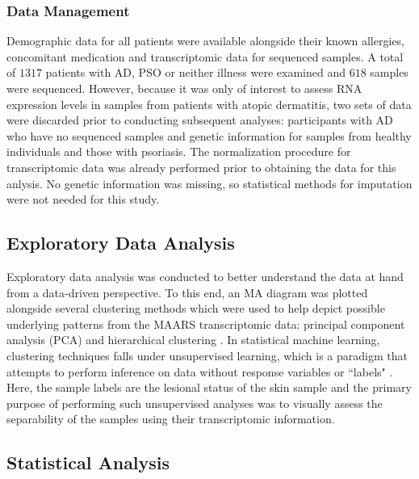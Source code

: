 \documentclass[journal, a4paper]{IEEEtran}
\begin{document}

\subsubsection*{Data Management}

Demographic data for all patients were available alongside their known allergies, concomitant medication and transcriptomic data for sequenced samples. A total of $1317$ patients with AD, PSO or neither illness were examined and $618$ samples were sequenced. However, because it was only of interest to assess RNA expression levels in samples from patients with atopic dermatitis, two sets of data were discarded prior to conducting subsequent analyses: participants with AD who have no sequenced samples and genetic information for samples from healthy individuals and those with psoriasis. The normalization procedure for transcriptomic data was already performed prior to obtaining the data for this anlysis. No genetic information was missing, so statistical methods for imputation were not needed for this study.


\subsection{Exploratory Data Analysis}

Exploratory data analysis was conducted to better understand the data at hand from a data-driven perspective. To this end, an MA diagram was plotted alongside several clustering methods which were used to help depict possible underlying patterns from the MAARS transcriptomic data: principal component analysis (PCA) and hierarchical clustering \cite{maaten2008visualizing, friedman2001elements}. In statistical machine learning, clustering techniques falls under unsupervised learning, which is a paradigm that attempts to perform inference on data without response variables or ``labels" \cite{friedman2001elements}. Here, the sample labels are the lesional status of the skin sample and the primary purpose of performing such unsupervised analyses was to visually assess the separability of the samples using their transcriptomic information.

\subsection{Statistical Analysis}

\end{document}
